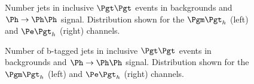 \begin{figure}
\begin{center}

\end{center}
\caption{
Number jets in inclusive $\Pgt\Pgt$ events in backgrounds and
$\Ph\to\Ph\Ph$ signal. Distribution shown for the $\mutau$ (left) and $\etau$
(right) channels. }
\label{fig:Hhhbjets}
\end{figure} 

\begin{figure}
\begin{center}

\end{center}
\caption{
Number of b-tagged jets in inclusive $\Pgt\Pgt$ events in backgrounds and
$\Ph\to\Ph\Ph$ signal. Distribution shown for the $\mutau$ (left) and $\etau$
(right) channels. }
\label{fig:Hhhnbjets}
\end{figure} 

